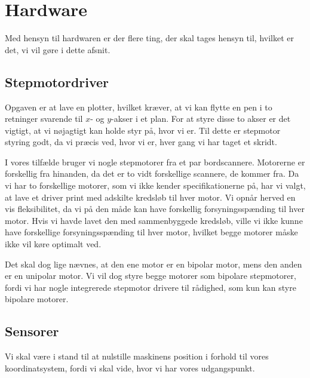 \chapter[Design af hardware]{Hardware}
\label{ch:d-hardware}


Med hensyn til hardwaren er der flere ting, der skal tages hensyn
til, hvilket er det, vi vil gøre i dette afsnit.

\section{Stepmotordriver}

Opgaven er at lave en plotter, hvilket kræver, at vi kan flytte en pen
i to retninger svarende til $x$- og $y$-akser i et plan. For at styre
disse to akser er det vigtigt, at vi nøjagtigt kan holde styr på, hvor vi
er. Til dette er stepmotor styring godt, da vi præcis ved, hvor vi er,
hver gang vi har taget et skridt.

I vores tilfælde bruger vi nogle stepmotorer fra et par
bordscannere. Motorerne er forskellig fra hinanden, da det er to vidt
forskellige scannere, de kommer fra. Da vi har to forskellige motorer,
som vi ikke kender specifikationerne på, har vi valgt, at lave et
driver print med adskilte kredsløb til hver motor. Vi opnår herved en
vis fleksibilitet, da vi på den måde kan have forskellig
forsyningsspænding til hver motor. Hvis vi havde lavet den med
sammenbyggede kredsløb, ville vi ikke kunne have forskellige
forsyningsspænding til hver motor, hvilket begge motorer måske ikke
vil køre optimalt ved.

Det skal dog lige nævnes, at den ene motor er en bipolar motor, mens
den anden er en unipolar motor. Vi vil dog styre begge motorer som
bipolare stepmotorer, fordi vi har nogle integrerede stepmotor
drivere til rådighed, som kun kan styre bipolare motorer.


\section{Sensorer}
\label{sc:sensorer}

Vi skal være i stand til at nulstille maskinens position i forhold til
vores koordinatsystem, fordi vi skal vide, hvor vi har vores
udgangspunkt.

